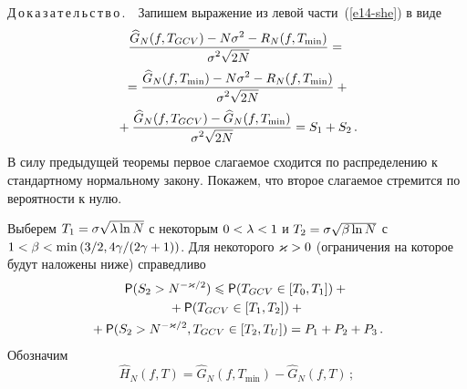 \begin{multicols}{2}
\medskip

\noindent
Д\,о\,к\,а\,з\,а\,т\,е\,л\,ь\,с\,т\,в\,о\,.\ \  Запишем выражение из левой части~(\ref{e14-she}) в виде
\begin{multline*}
\displaystyle\frac{\displaystyle \widehat{G}_N(f,T_{GCV})-N\sigma^2-R_N(f,T_{\min})\mathstrut}{\displaystyle \sigma^2\sqrt{2N}\mathstrut}={}\\
{}=
\displaystyle\frac{\displaystyle \widehat{G}_N(f,T_{\min})-N\sigma^2-R_N(f,T_{\min})\mathstrut}{\displaystyle \sigma^2\sqrt{2N}\mathstrut}+{}\\
{}+\displaystyle\frac{\displaystyle \widehat{G}_N(f,T_{GCV})-\widehat{G}_N(f,T_{\min})\mathstrut}{\displaystyle \sigma^2\sqrt{2N}\mathstrut}=S_1+S_2\,.
\end{multline*}
В силу предыдущей теоремы первое слагаемое сходится по распределению к стандартному нормальному закону. 
Покажем, что второе слагаемое стремится по вероятности к нулю.

Выберем $T_1\hm=\sigma\sqrt{\lambda\ln N}$ с некоторым $0\hm<\lambda\hm<1$ и $T_2\hm=\sigma\sqrt{\beta\ln N}$ с 
$1\hm<\beta\hm<\min\left({3}/{2},4\gamma/(2\gamma+1)\right)$. Для некоторого $\varkappa\hm>0$ (ограничения на которое 
будут наложены ниже) справедливо
\begin{multline*}
{\sf P}(S_2>N^{-\varkappa/2})\leqslant{\sf P}(T_{GCV}\in[T_0,T_1])+{}\\
{}+{\sf P}(T_{GCV}\in[T_1,T_2])+{}\\{}+
{\sf P}(S_2>N^{-\varkappa/2},T_{GCV}\in[T_2,T_U])=P_1+P_2+P_3\,.
\end{multline*}
Обозначим
$$
\widehat{H}_N(f,T)=\widehat{G}_N(f,T_{\min})-\widehat{G}_N(f,T)\,;
$$

\vspace*{-12pt}


\end{multicols}
